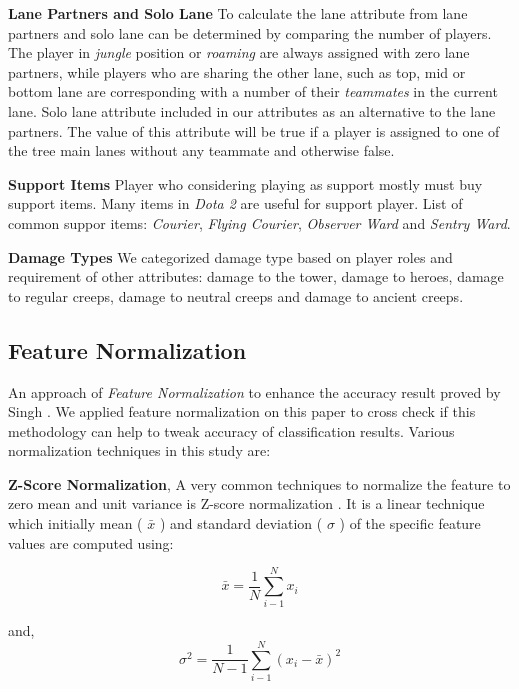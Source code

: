 \textbf{Lane Partners and Solo Lane} To calculate the lane attribute from lane partners and solo lane can be determined by comparing the number of players. The player in \textit{jungle} position or \textit{roaming} are always assigned with zero lane partners, while players who are sharing the other lane, such as top, mid or bottom lane are corresponding with a number of their \textit{teammates} in the current lane. Solo lane attribute included in our attributes as an alternative to the lane partners. The value of this attribute will be true if a player is assigned to one of the tree main lanes without any teammate and otherwise false.

\textbf{Support Items} Player who considering playing as support mostly must buy support items. Many items in \textit{Dota 2} are useful for support player. List of common suppor items: \textit{Courier}, \textit{Flying Courier}, \textit{Observer Ward} and \textit{Sentry Ward}. 

\textbf{Damage Types} We categorized damage type based on player roles and requirement of other attributes: damage to the tower, damage to heroes, damage to regular creeps, damage to neutral creeps and damage to ancient creeps.

\subsection{Feature Normalization}
\label{sec:featurenorm}

An approach of \textit{Feature Normalization} to enhance the accuracy result proved by Singh \cite{singh2015investigations}. We applied feature normalization on this paper to cross check if this methodology can help to tweak accuracy of classification results. Various normalization techniques in this study are:

\textbf{Z-Score Normalization}, A very common techniques to normalize the feature to zero mean and unit variance is Z-score normalization \cite{jayalakshmi2011statistical}. It is a linear technique which initially mean ( \(\bar{x}\) ) and standard deviation ( \(\sigma\) ) of the specific feature values are computed using:

\begin{equation}
\bar{x}=\frac{1}{N}\sum_{i-1}^{N}x_{i}
\end{equation}

and,
\begin{equation}
\sigma^2=\frac{1}{N-1}\sum_{i-1}^{N}(x_{i}-\bar{x})^2
\end{equation}

